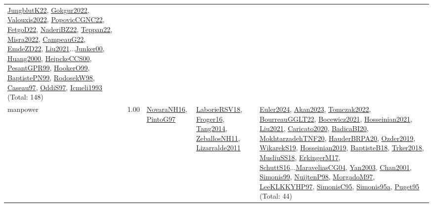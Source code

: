 {\begin{longtable}{p{3cm}r>{\raggedright\arraybackslash}p{6cm}>{\raggedright\arraybackslash}p{6cm}>{\raggedright\arraybackslash}p{8cm}}
\hyperref[detail:JungblutK22]{JungblutK22}, \hyperref[detail:Gokgur2022]{Gokgur2022}, \hyperref[detail:Valouxis2022]{Valouxis2022}, \hyperref[detail:PopovicCGNC22]{PopovicCGNC22}, \hyperref[detail:FetgoD22]{FetgoD22}, \hyperref[detail:NaderiBZ22]{NaderiBZ22}, \hyperref[detail:Teppan22]{Teppan22}, \hyperref[detail:Misra2022]{Misra2022}, \hyperref[detail:CampeauG22]{CampeauG22}, \hyperref[detail:EmdeZD22]{EmdeZD22}, \hyperref[detail:Liu2021]{Liu2021}...\hyperref[detail:Junker00]{Junker00}, \hyperref[detail:Huang2000]{Huang2000}, \hyperref[detail:HeipckeCCS00]{HeipckeCCS00}, \hyperref[detail:PesantGPR99]{PesantGPR99}, \hyperref[detail:HookerO99]{HookerO99}, \hyperref[detail:BaptistePN99]{BaptistePN99}, \hyperref[detail:RodosekW98]{RodosekW98}, \hyperref[detail:Caseau97]{Caseau97}, \hyperref[detail:OddiS97]{OddiS97}, \hyperref[detail:Icmeli1993]{Icmeli1993} (Total: 148)\\
\index{manpower}\index{Concepts!manpower}manpower &  1.00 & \hyperref[detail:NovaraNH16]{NovaraNH16}, \hyperref[detail:PintoG97]{PintoG97} & \hyperref[detail:LaborieRSV18]{LaborieRSV18}, \hyperref[detail:Froger16]{Froger16}, \hyperref[detail:Tang2014]{Tang2014}, \hyperref[detail:ZeballosNH11]{ZeballosNH11}, \hyperref[detail:Lizarralde2011]{Lizarralde2011} & \hyperref[detail:Euler2024]{Euler2024}, \hyperref[detail:Akan2023]{Akan2023}, \hyperref[detail:Tomczak2022]{Tomczak2022}, \hyperref[detail:BourreauGGLT22]{BourreauGGLT22}, \hyperref[detail:Bocewicz2021]{Bocewicz2021}, \hyperref[detail:Hosseinian2021]{Hosseinian2021}, \hyperref[detail:Liu2021]{Liu2021}, \hyperref[detail:Caricato2020]{Caricato2020}, \hyperref[detail:BadicaBI20]{BadicaBI20}, \hyperref[detail:MokhtarzadehTNF20]{MokhtarzadehTNF20}, \hyperref[detail:HauderBRPA20]{HauderBRPA20}, \hyperref[detail:Ozder2019]{Ozder2019}, \hyperref[detail:WikarekS19]{WikarekS19}, \hyperref[detail:Hosseinian2019]{Hosseinian2019}, \hyperref[detail:BaptisteB18]{BaptisteB18}, \hyperref[detail:Trker2018]{Trker2018}, \hyperref[detail:MusliuSS18]{MusliuSS18}, \hyperref[detail:ErkingerM17]{ErkingerM17}, \hyperref[detail:SchuttS16]{SchuttS16}...\hyperref[detail:MaraveliasCG04]{MaraveliasCG04}, \hyperref[detail:Yan2003]{Yan2003}, \hyperref[detail:Chan2001]{Chan2001}, \hyperref[detail:Simonis99]{Simonis99}, \hyperref[detail:NuijtenP98]{NuijtenP98}, \hyperref[detail:MorgadoM97]{MorgadoM97}, \hyperref[detail:LeeKLKKYHP97]{LeeKLKKYHP97}, \hyperref[detail:SimonisC95]{SimonisC95}, \hyperref[detail:Simonis95a]{Simonis95a}, \hyperref[detail:Puget95]{Puget95} (Total: 44)\\

\end{longtable}}
